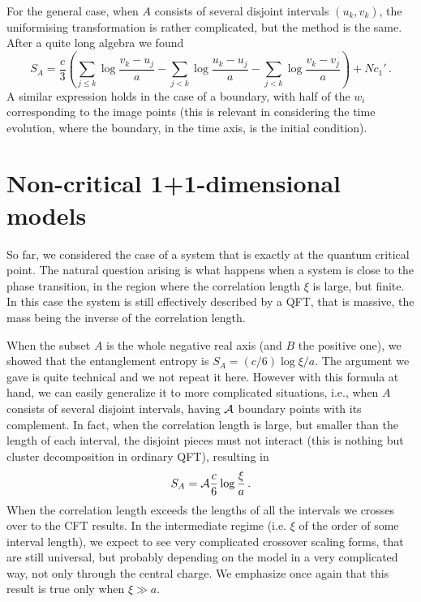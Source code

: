 \documentclass[12pt]{article}
\def\be{\begin{equation}}
\def\ee{\end{equation}}
\begin{document}
For the general case, when $A$ consists of several disjoint intervals 
$(u_k,v_k)$, the uniformising transformation is rather 
complicated,\cite{cc-04} but the method is the same. 
After a quite long algebra we found
\be
\label{general}
S_A=\frac c3\left(\sum_{j\leq k}\log\frac{v_k-u_j}{a}
-\sum_{j<k}\log\frac{u_k-u_j}{a}-\sum_{j<k}\log\frac{v_k-v_j}{a}
\right)+Nc_1'\,.
\ee
A similar expression holds in the case of a boundary, with half of the
$w_i$ corresponding to the image points (this is relevant in considering
the time evolution,\cite{cc-05} where the boundary, in the time axis, is 
the initial condition). 



\section{Non-critical 1+1-dimensional models}
\label{noncrit}

So far, we considered the case of a system that is exactly at the 
quantum critical point. The natural question arising is what happens 
when a system is close to the phase transition, in the region where the 
correlation length $\xi$ is large, but finite. 
In this case the system is 
still effectively described by a QFT, that is massive, the mass being the
inverse of the correlation length.

When the subset $A$ is the whole negative real axis (and $B$ the positive 
one), we showed that the entanglement entropy is $S_A=(c/6) \log\xi/a$.
The argument we gave\cite{cc-04} is quite technical and we not 
repeat it here. 
However with this formula at hand, we can easily generalize it to more 
complicated situations, i.e., when $A$ consists of several disjoint 
intervals, having ${\cal A}$ boundary points with its complement. 
In fact, when the correlation length is large, but smaller than the length 
of each interval, the disjoint pieces must not interact (this is nothing but 
cluster decomposition in ordinary QFT), resulting in
\be
S_A={\cal A} \frac{c}{6}\log\frac{\xi}{a}\,.
\label{Snoncrit}
\ee 
When the correlation length exceeds the lengths of all the intervals we 
crosses over to the CFT results. In the intermediate regime (i.e. $\xi$ of 
the order of some interval length), we expect to see very complicated 
crossover scaling forms, that are still universal, but probably depending 
on the model in a very complicated way, not only through the central charge.
We emphasize once again that this result is true only when $\xi\gg a$.
\end{document}
